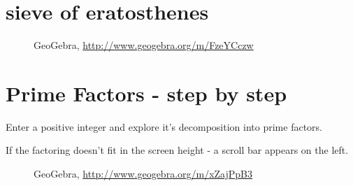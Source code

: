 \section{{sieve of eratosthenes}}
\begin{figure}[H]
\begin{center}
\caption*{GeoGebra, \url{http://www.geogebra.org/m/FzeYCczw}}
\end{center}
\end{figure}

\section{{Prime Factors - step by step}}
Enter a positive integer and explore it's decomposition into prime factors.

If the factoring doesn't fit in the screen height - a scroll bar appears on the left.

\begin{figure}[H]
\begin{center}
\caption*{GeoGebra, \url{http://www.geogebra.org/m/xZajPpB3}}
\end{center}
\end{figure}

